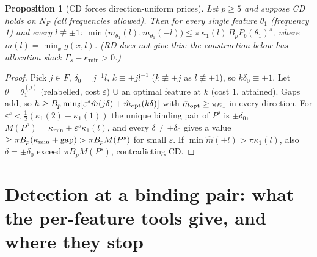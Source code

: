 \documentclass[11pt]{article}
\newtheorem{proposition}[theorem]{Proposition}
\theoremstyle{definition}
\begin{document}
\begin{proposition}[CD forces direction-uniform prices]\label{prop:du}
Let $p\ge5$ and suppose CD holds on $N_F$ (all frequencies allowed). Then for every single feature $\theta_1$ (frequency 1) and every
$l\not\equiv\pm1$: $\min\big(m_{\theta_1}(l),m_{\theta_1}(-l)\big)\le\pi\,\kappa_1(l)\,B_pP_b(\theta_1)^s$, where $m(l)=\min_xg(x,l)$.
(RD does not give this: the construction below has allocation slack $\Gamma_s-\kappa_{\min}>0$.)
\end{proposition}
\begin{proof} Pick $j\in F$, $\delta_0=j^{-1}l$, $k\equiv\pm jl^{-1}$ ($k\not\equiv\pm j$ as $l\not\equiv\pm1$), so $k\delta_0\equiv\pm1$.
Let $\theta=\theta_1^{(j)}$ (relabelled, cost $\varepsilon$) $\cup$ an optimal feature at $k$ (cost $1$, attained). Gaps add, so
$h\ge B_p\min_\delta[\varepsilon^s\hat m(j\delta)+\hat m_{\rm opt}(k\delta)]$ with $\hat m_{\rm opt}\ge\pi\kappa_1$ in every direction. For
$\varepsilon^s<\frac12(\kappa_1(2)-\kappa_1(1))$ the unique binding pair of $P^s$ is $\pm\delta_0$, $M(P^s)=\kappa_{\min}+\varepsilon^s\kappa_1(l)$,
and every $\delta\ne\pm\delta_0$ gives a value $\ge\pi B_p(\kappa_{\min}+{\rm gap})>\pi B_pM(P^s)$ for small $\varepsilon$. If
$\min\hat m(\pm l)>\pi\kappa_1(l)$, also $\delta=\pm\delta_0$ exceed $\pi B_pM(P^s)$, contradicting CD.\end{proof}

\section{Detection at a binding pair: what the per-feature tools give, and where they stop}
\end{document}
